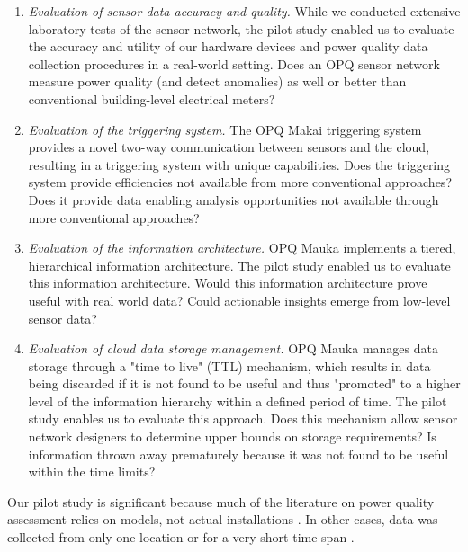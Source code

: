 \begin{enumerate}

\item {\em Evaluation of sensor data accuracy and quality.} While we conducted extensive laboratory tests of the sensor network, the pilot study enabled us to evaluate the accuracy and utility of our hardware devices and power quality data collection procedures in a real-world setting. Does an OPQ sensor network measure power quality (and detect anomalies) as well or better than conventional building-level electrical meters?

\item {\em Evaluation of the triggering system.} The OPQ Makai triggering system provides a novel two-way communication between sensors and the cloud, resulting in a triggering system with unique capabilities.  Does the triggering system provide efficiencies not available from more conventional approaches? Does it provide data enabling analysis opportunities not available through more conventional approaches?

\item {\em Evaluation of the information architecture.} OPQ Mauka implements a tiered, hierarchical information architecture.  The pilot study enabled us to evaluate this information architecture.  Would this information architecture prove useful with real world data? Could actionable insights emerge from low-level sensor data?

\item {\em Evaluation of cloud data storage management.} OPQ Mauka manages data storage through a "time to live" (TTL) mechanism, which results in data being discarded if it is not found to be useful and thus "promoted" to a higher level of the information hierarchy within a defined period of time.  The pilot study enables us to evaluate this approach. Does this mechanism allow sensor network designers to determine upper bounds on storage requirements? Is information thrown away prematurely because it was not found to be useful within the time limits?

\end{enumerate}

Our pilot study is significant because much of the literature on power quality assessment relies on models, not actual installations \cite{anurangi_effects_2017,bayindir_effects_2016,farhoodnea_power_2012,shafiullah_experimental_2014}. In other cases, data was collected from only one location or for a very short time span \cite{kucuk_assessment_2013,viciana_openzmeter_2018}.

